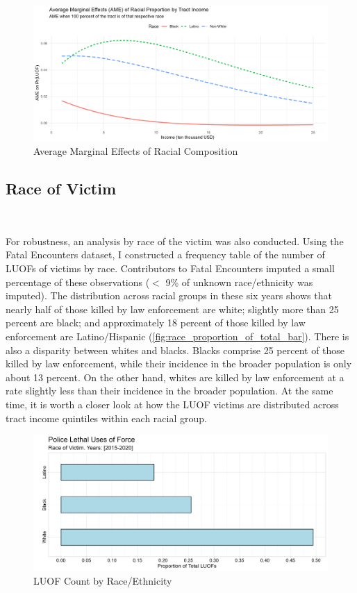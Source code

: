 \documentclass[12pt]{article}
\begin{document}
\begin{figure}[H]
  \centering
  \includegraphics[width=\linewidth]{images/ame_race_by_income}
  \captionsetup{justification=centering, singlelinecheck=false, margin=2cm}
  \caption{Average Marginal Effects of Racial Composition}
  \label{fig:ame_race_by_income}
\end{figure}

\subsection{Race of Victim}\

For robustness, an analysis by race of the victim was also conducted. Using the Fatal Encounters dataset, I constructed a frequency table of the number of LUOFs of victims by race. Contributors to Fatal Encounters imputed a small percentage of these observations ($<$ 9\% of unknown race/ethnicity was imputed). The distribution across racial groups in these six years shows that nearly half of those killed by law enforcement are white; slightly more than 25 percent are black; and approximately 18 percent of those killed by law enforcement are Latino/Hispanic (\autoref{fig:race_proportion_of_total_bar}). There is also a disparity between whites and blacks. Blacks comprise 25 percent of those killed by law enforcement, while their incidence in the broader population is only about 13 percent. On the other hand, whites are killed by law enforcement at a rate slightly less than their incidence in the broader population. At the same time, it is worth a closer look at how the LUOF victims are distributed across tract income quintiles within each racial group.

\begin{figure}[H]
  \centering
  \includegraphics[width=\linewidth]{images/race_proportion_of_total_bar}
  \captionsetup{justification=centering, singlelinecheck=false, margin=2cm}
  \caption{LUOF Count by Race/Ethnicity}
  \label{fig:race_proportion_of_total_bar}
\end{figure}
\end{document}
